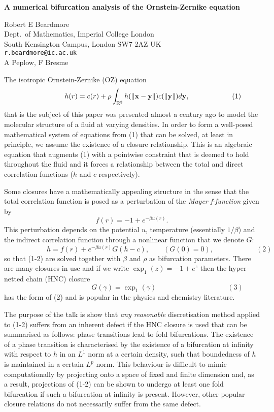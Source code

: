 \documentclass[twosided]{report}
\begin{document}
\begin{center}
{\large			%
{\bf A numerical bifurcation analysis of the Ornstein-Zernike equation}}

	Robert E Beardmore \\
	Dept.~of Mathematics, Imperial College London \\
	South Kensington Campus,  London SW7 2AZ UK \\
	{\tt r.beardmore@ic.ac.uk} \\
	A Peplow, F Bresme
\end{center}
The isotropic Ornstein-Zernike (OZ) equation
$$
\qquad
\qquad
\qquad
h(r) = c(r) + \rho \int_{\mathbb{R}^{3}}
h(\|{\bf x}-{\bf y}\|)c(\|{\bf y}\|)d{\bf y},
\qquad
\qquad
\qquad
(1)
$$
that is the subject of this
paper was presented almost a century ago to model the
molecular structure of a fluid at varying densities. In
order to form a well-posed mathematical system of equations
from (1) that can be solved, at least in
principle, we assume the existence of a closure
relationship. This is an algebraic equation that augments
(1) with a pointwise constraint that is deemed to
hold throughout the fluid and it forces a relationship
between the total and direct correlation functions ($h$ and
$c$ respectively).

Some closures have a mathematically
appealing structure in the sense that the total correlation
function is posed as a perturbation of the {\em Mayer
f-function} given by \[ f(r)=-1+e^{-\beta u(r)}.\] This
perturbation depends on the potential $u$, temperature
(essentially $1/\beta$) and the indirect correlation
function through a nonlinear function that we denote $G$:
$$
\qquad
\qquad
\qquad
h = f(r) + e^{-\beta u(r)}G(h-c),
\qquad
(G(0)= 0),
\qquad
\qquad
\qquad
(2)
$$
so that (1-2) are solved together with $\beta$
and $\rho$ as bifurcation parameters. There are many
closures in use and if we write $\exp_1(z) = -1+e^z$ then
the hyper-netted chain (HNC) closure
$$
\qquad
\qquad
\qquad
\qquad
\qquad
G(\gamma) = \exp_1(\gamma)
\qquad
\qquad
\qquad
\qquad
\qquad
(3)
$$
has the form of
(2) and is popular in the physics and chemistry
literature.

The purpose of the talk is show that {\em any
reasonable} discretisation method applied to
(1-2) suffers from an inherent defect if
the HNC closure is used that can be summarised as follows:
phase transitions lead to fold bifurcations. The existence
of a phase transition is characterised by the existence of a
bifurcation at infinity with respect to $h$ in an $L^1$ norm
at a certain density, such that boundedness of $h$ is
maintained in a certain $L^p$ norm. This behaviour is
difficult to mimic computationally by projecting onto a
space of fixed and finite dimension and, as a result,
projections of (1-2) can be shown to
undergo at least one fold bifurcation if such a bifurcation
at infinity is present. However, other popular closure
relations do not necessarily suffer from the same defect.
\end{document}
